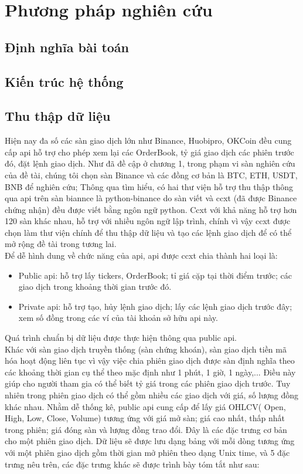 \chapter{Phương pháp nghiên cứu}
\label{chap-Research_method}
\section{Định nghĩa bài toán}

\section{Kiến trúc hệ thống}

\section{Thu thập dữ liệu}\label{Research_data_crawl}
Hiện nay đa số  các sàn giao dịch lớn như Binance, Huobipro, OKCoin đều cung cấp api hỗ trợ cho phép xem lại các OrderBook, tỷ giá giao dịch các phiên trước đó, đặt lệnh giao dịch. Như đã đề cập ở chương 1, trong phạm vi sàn nghiên cứu của đề tài, chúng tôi chọn sàn Binance và các đồng cơ bản là BTC, ETH, USDT, BNB để nghiên cứu; Thông qua tìm hiểu, có hai thư viện hỗ trợ thu thập thông qua api trên sàn biannce là python-binance do sàn viết và ccxt (đã được Binance chứng nhận) đều được viết bằng ngôn ngữ python. Ccxt với khả năng hỗ trợ hơn 120 sàn khác nhau, hỗ trợ với nhiều ngôn ngữ lập trình, chính vì vậy ccxt được chọn làm thư viện chính để  thu thập dữ liệu và tạo các lệnh giao dịch để có thể mở rộng đề tài trong tương lai.\\
Để dễ hình dung về chức năng của api, api được ccxt chia thành hai loại là:
\begin{itemize}
    \item Public api: hỗ trợ lấy tickers, OrderBook; tỉ giá cặp tại thời điểm trước; các giao dịch trong khoảng thời gian trước đó.
    \item Private api: hỗ trợ tạo, hủy lệnh giao dịch; lấy các lệnh giao dịch trước đây; xem số đồng trong các ví của tài khoản sở hữu api này.
\end{itemize}
Quá trình chuẩn bị dữ liệu được thực hiện thông qua public api.\\
Khác với sàn giao dịch truyền thống (sàn chứng khoán), sàn giao dịch tiền mã hóa hoạt động liên tục vì vậy việc chia phiên giao dịch được sàn định nghĩa theo các khoảng thời gian cụ thể theo mặc định như 1 phút, 1 giờ, 1 ngày,... Điều này giúp cho người tham gia có thể biết tỷ giá trong các phiên giao dịch trước. Tuy nhiên trong phiên giao dịch có thể gồm nhiều các giao dịch với giá, số lượng đồng khác nhau. Nhằm dễ  thống kê, public api cung cấp để lấy giá OHLCV( Open, High, Low, Close, Volume) tương ứng với giá mở sàn; giá cao nhất, thấp nhất trong phiên; giá đóng sàn và lượng đồng trao đổi. Đây là các đặc trưng cơ bản cho một phiên giao dịch. Dữ liệu sẽ được lưu dạng bảng với mỗi dòng tương ứng với một phiên giao dịch gồm thời gian mở phiên theo dạng Unix time, và 5 đặc trưng nêu trên, các đặc trưng khác sẽ được trình bày tóm tắt như sau:
